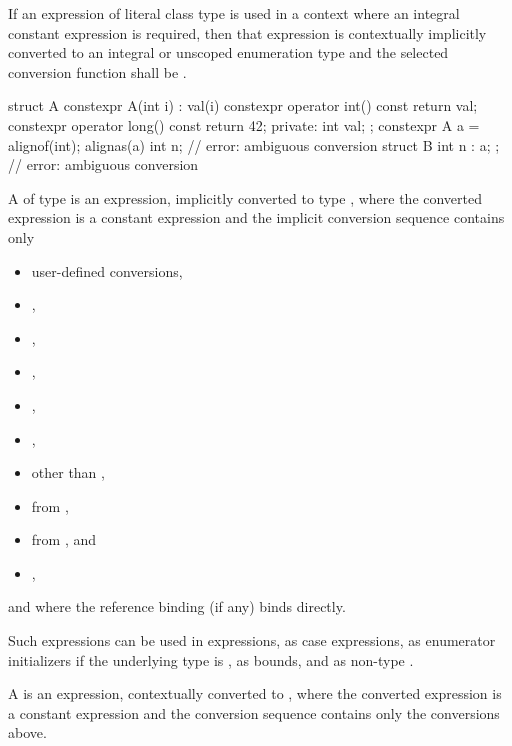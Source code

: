 \pnum
If an expression of literal class type is used in a context where an
integral constant expression is required, then that expression is
contextually implicitly converted to an integral or unscoped
enumeration type
and the selected conversion function shall be .
\begin{example}
\begin{codeblock}
struct A {
  constexpr A(int i) : val(i) { }
  constexpr operator int() const { return val; }
  constexpr operator long() const { return 42; }
private:
  int val;
};
constexpr A a = alignof(int);
alignas(a) int n;               // error: ambiguous conversion
struct B { int n : a; };        // error: ambiguous conversion
\end{codeblock}
\end{example}

\pnum
A 
of type  is an
expression, implicitly converted to type , where
the converted expression is a constant expression and the
implicit conversion sequence contains only
\begin{itemize}
\item user-defined conversions,
\item {},
\item {},
\item {},
\item {},
\item {},
\item {} other than
,
\item {} from ,
\item {} from , and
\item {},
\end{itemize}
and where the reference binding (if any) binds directly.
\begin{note}
Such expressions can be used in 
expressions, as case expressions,
as enumerator initializers if the underlying type is
, as  bounds, and
as non-type .
\end{note}
%
%
A  is
an expression, contextually converted to ,
where the converted expression is a constant expression and
the conversion sequence contains only the conversions above.

